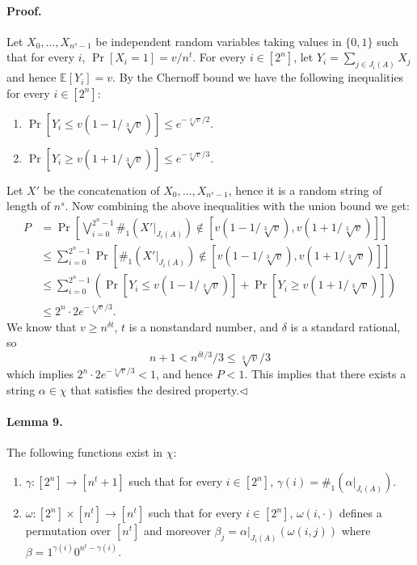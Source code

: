 \documentclass[10pt,a4paper]{article}
\begin{document}
\paragraph{Proof.} Let $X_0,\ldots,X_{n^s-1}$ be independent random variables taking values in $\{0,1\}$ such that for every $i$, $\Pr[X_i=1]=v/n^t$. For every $i\in[2^n]$, let $Y_i=\sum_{j\in J_i(A)}X_j$ and hence $\mathbb E[Y_i]=v$.
By the Chernoff bound we have the following inequalities for every $i\in[2^n]$:
\begin{enumerate}
\item $\Pr[Y_i\leq v(1-1/\sqrt[3]v)]\leq e^{-\sqrt[3]v/2}$.
\item $\Pr[Y_i\geq v(1+1/\sqrt[3]v)]\leq e^{-\sqrt[3]v/3}$.
\end{enumerate}
Let $X'$ be the concatenation of $X_0,\ldots,X_{n^s-1}$, hence it is a random string of length of $n^s$. Now combining the above inequalities with the union bound we get:
\begin{align*}
P&=\Pr\left[\bigvee_{i=0}^{2^n-1}\#_1(X'|_{J_i(A)})\notin[v(1-1/\sqrt[3]v),v(1+1/\sqrt[3]v)]\right]\\
&\leq\sum_{i=0}^{2^n-1}\Pr[\#_1(X'|_{J_i(A)})\notin[v(1-1/\sqrt[3]v),v(1+1/\sqrt[3]v)]]\\
&\leq\sum_{i=0}^{2^n-1}(\Pr[Y_i\leq v(1-1/\sqrt[3]v)]+\Pr[Y_i\geq v(1+1/\sqrt[3]v)])\\
&\leq2^n\cdot2e^{-\sqrt[3]v/3}.
\end{align*}
We know that $v\geq n^{\delta t}$, $t$ is a nonstandard number, and $\delta$ is a standard rational, so
\[n+1<n^{\delta t/3}/3\leq\sqrt[3]v/3\]
which implies $2^n\cdot2e^{-\sqrt[3]v/3}<1$, and hence $P<1$. This implies that there exists a string $\alpha\in\chi$ that satisfies the desired property.\hfill$\triangleleft$
\paragraph{Lemma 9.} The following functions exist in $\chi$:
\begin{enumerate}
\item $\gamma:[2^n]\to[n^t+1]$ such that for every $i\in[2^n]$, $\gamma(i)=\#_1(\alpha|_{J_i(A)})$.
\item $\omega:[2^n]\times[n^t]\to[n^t]$ such that for every $i\in[2^n]$, $\omega(i,\cdot)$ defines a permutation over $[n^t]$ and moreover $\beta_j=\alpha|_{J_i(A)}(\omega(i,j))$ where $\beta=1^{\gamma(i)}0^{n^t-\gamma(i)}$.
\end{enumerate}
\end{document}

